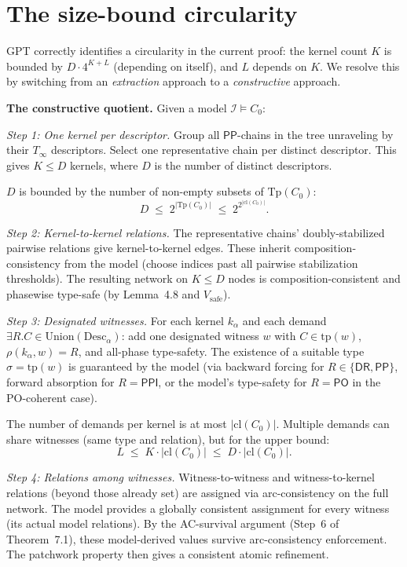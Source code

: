 \documentclass[11pt]{article}
\begin{document}
\section{The size-bound circularity}
\label{sec:o3}

GPT correctly identifies a circularity in the current proof: the
kernel count $K$ is bounded by $D \cdot 4^{K+L}$ (depending on
itself), and $L$ depends on $K$.  We resolve this by switching from
an \emph{extraction} approach to a \emph{constructive} approach.

\textbf{The constructive quotient.}\; Given a model
$\mathcal{I} \models C_0$:

\medskip\noindent\textit{Step 1: One kernel per descriptor.}\;
Group all $\mathsf{PP}$-chains in the tree unraveling by their
$T_\infty$ descriptors.  Select one representative chain per
distinct descriptor.  This gives $K \le D$ kernels, where $D$
is the number of distinct descriptors.

$D$ is bounded by the number of non-empty subsets of $\mathrm{Tp}(C_0)$:
\[
D \;\le\; 2^{|\mathrm{Tp}(C_0)|} \;\le\; 2^{2^{|\mathrm{cl}(C_0)|}}.
\]

\medskip\noindent\textit{Step 2: Kernel-to-kernel relations.}\;
The representative chains' doubly-stabilized pairwise relations give
kernel-to-kernel edges.  These inherit composition-consistency from
the model (choose indices past all pairwise stabilization thresholds).
The resulting network on $K \le D$ nodes is composition-consistent
and phasewise type-safe (by Lemma~4.8 and $V_\mathrm{safe}$).

\medskip\noindent\textit{Step 3: Designated witnesses.}\; For each
kernel $k_\alpha$ and each demand
$\exists R.C \in \mathrm{Union}(\mathrm{Desc}_\alpha)$: add one
designated witness $w$ with $C \in \mathrm{tp}(w)$,
$\rho(k_\alpha, w) = R$, and all-phase type-safety.  The existence
of a suitable type $\sigma = \mathrm{tp}(w)$ is guaranteed by the
model (via backward forcing for $R \in \{\mathsf{DR}, \mathsf{PP}\}$,
forward absorption for $R = \mathsf{PPI}$, or the model's
type-safety for $R = \mathsf{PO}$ in the PO-coherent case).

The number of demands per kernel is at most
$|\mathrm{cl}(C_0)|$.  Multiple demands can share witnesses (same
type and relation), but for the upper bound:
\[
L \;\le\; K \cdot |\mathrm{cl}(C_0)| \;\le\; D \cdot |\mathrm{cl}(C_0)|.
\]

\medskip\noindent\textit{Step 4: Relations among witnesses.}\;
Witness-to-witness and witness-to-kernel relations (beyond those
already set) are assigned via arc-consistency on the full network.
The model provides a globally consistent assignment for every
witness (its actual model relations).  By the AC-survival argument
(Step~6 of Theorem~7.1), these model-derived values survive
arc-consistency enforcement.  The patchwork property then gives
a consistent atomic refinement.
\end{document}

